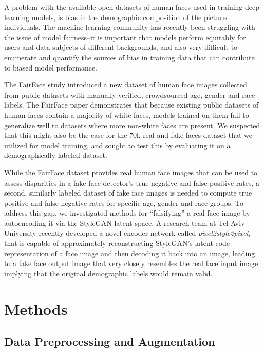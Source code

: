 \documentclass[11pt, letterpaper]{article}
\begin{document}
\begin{multicols}{2}
  A problem with the available open datasets of human faces used in
  training deep learning models, is bias in the demographic
  composition of the pictured individuals. The machine learning
  community has recently been struggling with the issue of model
  fairness--it is important that models perform equitably for users
  and data subjects of different backgrounds, and also very difficult
  to enumerate and quantify the sources of bias in training data that
  can contribute to biased model performance.

  The FairFace\cite{karkkainen2019fairface} study introduced a new
  dataset of human face images collected from public datasets with
  manually verified, crowdsourced age, gender and race labels. The
  FairFace paper demonstrates that because existing public datasets of
  human faces contain a majority of white faces, models trained on
  them fail to generalize well to datasets where more non-white faces
  are present. We suspected that this might also be the case for the
  70k real and fake faces dataset that we utilized for model training,
  and sought to test this by evaluating it on a demographically
  labeled dataset.

  While the FairFace dataset provides real human face images that can
  be used to assess disparities in a fake face detector's true
  negative and false positive rates, a second, similarly labeled
  dataset of fake face images is needed to compute true positive and
  false negative rates for specific age, gender and race groups. To
  address this gap, we investigated methods for ``falsifying'' a real
  face image by autoencoding it via the StyleGAN latent space. A
  research team at Tel Aviv University recently developed a novel
  encoder network\cite{richardson2020encoding} called
  \emph{pixel2style2pixel}, that is capable of approximately
  reconstructing StyleGAN's latent code representation of a face image
  and then decoding it back into an image, leading to a fake face
  output image that very closely resembles the real face input image,
  implying that the original demographic labels would remain valid.

  \section{Methods}

  \subsection{Data Preprocessing and Augmentation}


\end{multicols}
\end{document}
